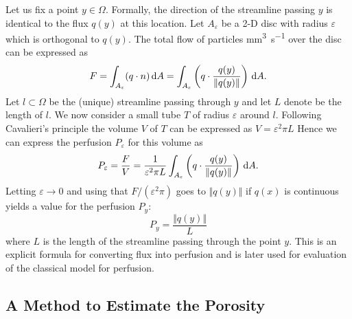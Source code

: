 \documentclass[paper=a4, fontsize=11pt,parskip=half,headings=small]{scrartcl}
\newcommand{\siqt}{\cubic\milli\meter\per\second}
\begin{document}
	Let us fix a point $y \in \Omega$.
	Formally, the direction of the streamline passing $y$ is identical to the flux $q(y)$ at this location. 
	Let $A_\varepsilon$ be a 2-D disc with radius $\varepsilon$ which is orthogonal to $q(y)$.
	The total flow of particles \si{\siqt} over the disc can be expressed as
	\[
		F = \int_{A_\varepsilon} (q \cdot n) \,\mathrm{d} A = \int_{A_\varepsilon} \left(q\cdot \frac{q(y)}{\Vert q(y) \Vert}\right) \,\mathrm{d} A.
	\]
	Let $l \subset \Omega$ be the (unique) streamline passing through $y$ and let $L$ denote be the length of $l$.
	We now consider a small tube $T$ of radius $\varepsilon$ around $l$.
	Following Cavalieri's principle the volume $V$ of $T$ can be expressed as $V = \varepsilon^2\pi L$
	Hence we can express the perfusion $P_\varepsilon$ for this volume as
	\[
		P_\varepsilon = \frac{F}{V} = \frac{1}{\varepsilon^2 \pi L} \int_{A_\varepsilon} \left( q\cdot \frac{q(y)}{\Vert q(y) \Vert} \right) \,\mathrm{d} A. 
	\]
	Letting $\varepsilon \to 0$ and using that $F/(\varepsilon^2\pi)$ goes to $\Vert q(y) \Vert$ if $q(x)$ is continuous yields a value for the perfusion $P_{y}$:
	\begin{equation}
		P_{y} = \frac{\Vert q(y) \Vert}{L}
		\label{eq:flux2perf}
	\end{equation}
	where $L$ is the length of the streamline passing through the point $y$. 
	This is an explicit formula for converting flux into perfusion and is later used for evaluation of the classical model for perfusion. 
	
	
	


	\subsection{A Method to Estimate the Porosity}\label{sec:CBV}
	
\end{document}
